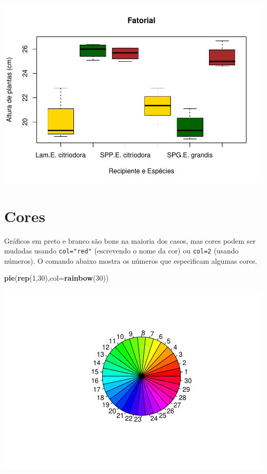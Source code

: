 \documentclass[]{book}
\newenvironment{Shaded}{\begin{snugshade}}{\end{snugshade}}
\newcommand{\DataTypeTok}[1]{\textcolor[rgb]{0.13,0.29,0.53}{#1}}
\newcommand{\DecValTok}[1]{\textcolor[rgb]{0.00,0.00,0.81}{#1}}
\newcommand{\KeywordTok}[1]{\textcolor[rgb]{0.13,0.29,0.53}{\textbf{#1}}}
\newcommand{\NormalTok}[1]{#1}
\begin{document}
\includegraphics{TudodoR_files/figure-latex/unnamed-chunk-174-1.pdf}

\hypertarget{cores}{%
\section{Cores}\label{cores}}

Gráficos em preto e branco são bons na maioria dos casos, mas cores podem ser mudadas usando \texttt{col="red"} (escrevendo o nome da cor) ou \texttt{col=2} (usando números).
O comando abaixo mostra os números que especificam algumas cores.

\begin{Shaded}
\begin{Highlighting}[]
\KeywordTok{pie}\NormalTok{(}\KeywordTok{rep}\NormalTok{(}\DecValTok{1}\NormalTok{,}\DecValTok{30}\NormalTok{),}\DataTypeTok{col=}\KeywordTok{rainbow}\NormalTok{(}\DecValTok{30}\NormalTok{))}
\end{Highlighting}
\end{Shaded}

\includegraphics{TudodoR_files/figure-latex/unnamed-chunk-175-1.pdf}
\end{document}

